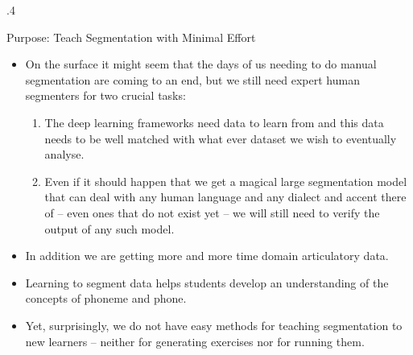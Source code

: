 \documentclass[final,hyperref={pdfpagelabels=false}]{beamer}
\begin{document}
\begin{frame}{}
\begin{columns}[t]
\begin{column}{.4\linewidth}
      \begin{block}{Purpose: Teach Segmentation with Minimal Effort}
        \begin{itemize}
        \item On the surface it might seem that the days of us needing to do
          manual segmentation are coming to an end, but we still need expert human
          segmenters for two crucial tasks:
        \begin{enumerate}
          \item The deep learning frameworks need data to learn from and
            this data needs to be well matched with what ever dataset we wish to
            eventually analyse.
          \item Even if it should happen that we get a magical large
            segmentation model that can deal with any human language and any
            dialect and accent there of -- even ones that do not exist yet -- we
            will still need to verify the output of any such model.
        \end{enumerate}
        \item In addition we are getting more and more time domain articulatory
        data. 
        \item Learning to segment data helps students develop an understanding
          of the concepts of phoneme and phone.
        \item Yet, surprisingly, we do not have easy methods for teaching
          segmentation to new learners -- neither for generating exercises nor
          for running them.
        \end{itemize}
      \end{block}


\end{column}
\end{columns}
\end{frame}
\end{document}
